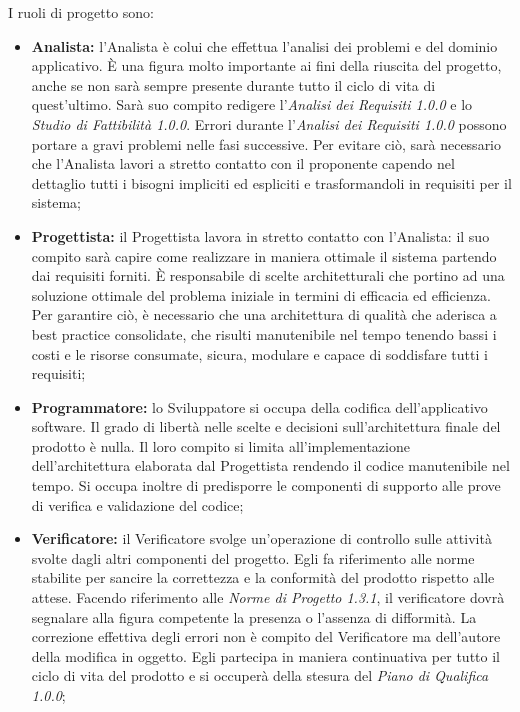 			\noindent I ruoli di progetto sono:
			\begin{itemize}
				\item \textbf{Analista:} l'Analista è colui che effettua l'analisi dei problemi e del dominio applicativo. \`{E} una figura molto importante ai fini della riuscita del progetto, anche se non sarà sempre presente durante tutto il ciclo di vita di quest'ultimo. Sarà suo compito redigere l'\textit{Analisi dei Requisiti 1.0.0\doc} e lo \textit{Studio di Fattibilità 1.0.0\doc}. Errori durante l'\textit{Analisi dei Requisiti 1.0.0\doc} possono portare a gravi problemi nelle fasi successive. Per evitare ciò, sarà necessario che l'Analista lavori a stretto contatto con il proponente capendo nel dettaglio tutti i bisogni impliciti ed espliciti e trasformandoli in requisiti per il sistema;
				\item \textbf{Progettista:} il Progettista lavora in stretto contatto con l'Analista: il suo compito sarà capire come realizzare in maniera ottimale il sistema partendo dai requisiti forniti. È responsabile di scelte architetturali che portino ad una soluzione ottimale del problema iniziale in termini di efficacia ed efficienza. Per garantire ciò, è necessario che una architettura di qualità che aderisca a best practice consolidate, che risulti manutenibile nel tempo tenendo bassi i costi e le risorse consumate, sicura, modulare e capace di soddisfare tutti i requisiti;
				\item \textbf{Programmatore:} lo Sviluppatore si occupa della codifica dell'applicativo software. Il grado di libertà nelle scelte e decisioni sull'architettura finale del prodotto è nulla. Il loro compito si limita all'implementazione dell'architettura elaborata dal Progettista rendendo il codice manutenibile nel tempo. Si occupa inoltre di predisporre le componenti di supporto alle prove di verifica e validazione del codice;
				\item \textbf{Verificatore:} il Verificatore svolge un'operazione di controllo sulle attività svolte dagli altri componenti del progetto. Egli fa riferimento alle norme stabilite per sancire la correttezza e la conformità del prodotto rispetto alle attese. Facendo riferimento alle \textit{Norme di Progetto 1.3.1\doc}, il verificatore dovrà segnalare alla figura competente la presenza o l'assenza di difformità. La correzione effettiva degli errori non è compito del Verificatore ma dell'autore della modifica in oggetto. Egli partecipa in maniera continuativa per tutto il ciclo di vita del prodotto e si occuperà della stesura del \textit{Piano di Qualifica 1.0.0\docs};

\end{itemize}
